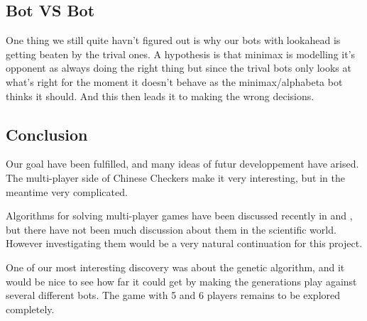 
\subsection{Bot VS Bot}
One thing we still quite havn't figured out is why our bots with lookahead is
getting beaten by the trival ones. A hypothesis is that minimax is modelling
it's opponent as always doing the right thing but since the trival bots only
looks at what's right for the moment it doesn't behave as the minimax/alphabeta
bot thinks it should. And this then leads it to making the wrong decisions.

\subsection{Conclusion}
Our goal have been fulfilled, and many ideas of futur developpement have
arised. The multi-player side of Chinese Checkers make it very interesting,
but in the meantime very complicated.

Algorithms for solving multi-player games have been discussed recently in
\cite{Hashavit} and \cite{bestreplysearch}, but there have not been much
discussion about them in the scientific world. However investigating them
would be a very natural continuation for this project.

One of our most interesting discovery was about the genetic algorithm, and
it would be nice to see how far it could get by making the generations play
against several different bots. The game with 5 and 6 players remains to be
explored completely.

